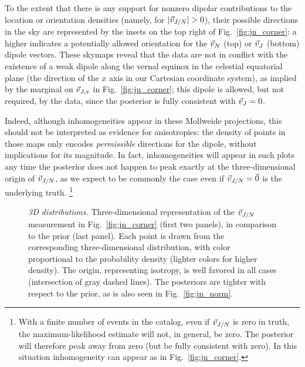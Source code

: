 \documentclass[aps,prd,twocolumn,superscriptaddress,preprintnumbers,floatfix,nofootinbib]{revtex4-2}
\begin{document}
To the extent that there is any support for nonzero dipolar contributions to the location or orientation densities (namely, for $|\vec{v}_{J/N}| > 0$), their possible directions in the sky are represented by the insets on the top right of Fig.~\ref{fig:jn_corner}: a higher indicates a potentially allowed orientation for the $\vec{v}_{N}$ (top) or $\vec{v}_{J}$ (bottom) dipole vectors.
These skymaps reveal that the data are not in conflict with the existence of a weak dipole along the vernal equinox in the celestial equatorial plane (the direction of the $x$ axis in our Cartesian coordinate system), as implied by the marginal on $\vec{v}_{J,x}$ in Fig.~\ref{fig:jn_corner}; this dipole is allowed, but not required, by the data, since the posterior is fully consistent with $\vec{v}_{J} = 0$.

Indeed, although inhomogeneities appear in these Mollweide projections, this should not be interpreted as evidence for anisotropies: the density of points in those maps only encodes \emph{permissible} directions for the dipole, without implications for its magnitude.
In fact, inhomogeneities will appear in such plots any time the posterior does not happen to peak exactly at the three-dimensional origin of $\vec{v}_{J/N}$, as we expect to be commonly the case even if $\vec{v}_{J/N}=\vec{0}$ is the underlying truth.%
\footnote{With a finite number of events in the catalog, even if $\vec{v}_{J/N}$ is zero in truth, the maximum-likelihood estimate will not, in general, be zero. The posterior will therefore peak away from zero (but be fully consistent with zero). In this situation inhomogeneity can appear as in Fig.\ \ref{fig:jn_corner}.}

\begin{figure*}
\caption{\emph{3D distributions.} Three-dimensional representation of the $\vec{v}_{J/N}$ measurement in Fig.~\ref{fig:jn_corner} (first two panels), in comparison to the prior (last panel).
Each point is drawn from the corresponding three-dimensional distribution, with color proportional to the probability density (lighter colors for higher density).
The origin, representing isotropy, is well favored in all cases (intersection of gray dashed lines).
The posteriors are tighter with respect to the prior, as is also seen in Fig.~\ref{fig:jn_norm}.
}
\label{fig:density_3d}
\end{figure*}
\end{document}
